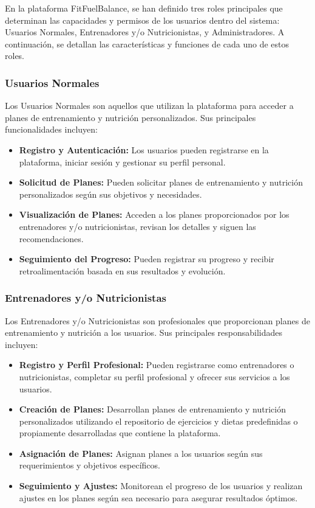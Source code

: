 En la plataforma FitFuelBalance, se han definido tres roles principales que determinan las capacidades y permisos de los usuarios dentro del sistema: Usuarios Normales, Entrenadores y/o Nutricionistas, y Administradores. A continuación, se detallan las características y funciones de cada uno de estos roles.

\subsubsection{Usuarios Normales}

Los Usuarios Normales son aquellos que utilizan la plataforma para acceder a planes de entrenamiento y nutrición personalizados. Sus principales funcionalidades incluyen:

\begin{itemize}
    \item \textbf{Registro y Autenticación:} Los usuarios pueden registrarse en la plataforma, iniciar sesión y gestionar su perfil personal.
    \item \textbf{Solicitud de Planes:} Pueden solicitar planes de entrenamiento y nutrición personalizados según sus objetivos y necesidades.
    \item \textbf{Visualización de Planes:} Acceden a los planes proporcionados por los entrenadores y/o nutricionistas, revisan los detalles y siguen las recomendaciones.
    \item \textbf{Seguimiento del Progreso:} Pueden registrar su progreso y recibir retroalimentación basada en sus resultados y evolución.
\end{itemize}

\subsubsection{Entrenadores y/o Nutricionistas}

Los Entrenadores y/o Nutricionistas son profesionales que proporcionan planes de entrenamiento y nutrición a los usuarios. Sus principales responsabilidades incluyen:

\begin{itemize}
    \item \textbf{Registro y Perfil Profesional:} Pueden registrarse como entrenadores o nutricionistas, completar su perfil profesional y ofrecer sus servicios a los usuarios.
    \item \textbf{Creación de Planes:} Desarrollan planes de entrenamiento y nutrición personalizados utilizando el repositorio de ejercicios y dietas predefinidas o propiamente desarrolladas que contiene la plataforma.
    \item \textbf{Asignación de Planes:} Asignan planes a los usuarios según sus requerimientos y objetivos específicos.
    \item \textbf{Seguimiento y Ajustes:} Monitorean el progreso de los usuarios y realizan ajustes en los planes según sea necesario para asegurar resultados óptimos.
\end{itemize}

